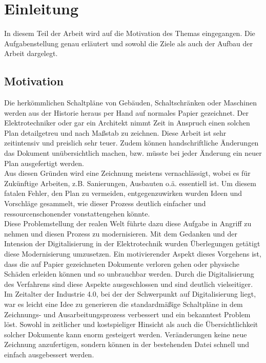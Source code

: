 
\chapter{Einleitung}
In diesem Teil der Arbeit wird auf die Motivation des Themas eingegangen. 
Die Aufgabenstellung genau erläutert und sowohl die Ziele als auch der Aufbau der Arbeit dargelegt.
\section{Motivation}
Die herkömmlichen Schaltpläne von Gebäuden, Schaltschränken oder Maschinen werden aus der Historie heraus per Hand auf normales Papier
gezeichnet. Der Elektrotechniker oder gar ein Architekt nimmt Zeit in Anspruch einen solchen Plan detailgetreu und 
nach Maßstab zu zeichnen. Diese Arbeit ist sehr zeitintensiv und preislich sehr teuer. Zudem können handschriftliche Änderungen
das Dokument unübersichtlich machen, bzw. müsste bei jeder Änderung ein neuer Plan ausgefertigt werden. 
\\Aus diesen Gründen wird eine Zeichnung meistens vernachlässigt, wobei es für Zukünftige Arbeiten,
z.B. Sanierungen, Ausbauten o.ä. essentiell ist. Um diesem fatalen Fehler, den Plan zu vermeiden, entgegenzuwirken wurden Ideen und
Vorschläge gesammelt, wie dieser Prozess deutlich einfacher und ressourcenschonender vonstattengehen könnte.
\\
\linebreak
Diese Problemstellung der realen Welt führte dazu diese Aufgabe in Angriff zu nehmen und diesen Prozess zu modernisieren.
Mit dem Gedanken und der Intension der Digitalisierung in der Elektrotechnik wurden Überlegungen getätigt diese Modernisierung
umzusetzen.
\linebreak
\linebreak
Ein motivierender Aspekt dieses Vorgehens ist, dass die auf Papier gezeichneten Dokumente verloren gehen oder physische Schäden erleiden können
und so unbrauchbar werden. Durch die Digitalisierung des Verfahrens sind diese Aspekte ausgeschlossen und sind deutlich vielseitiger.
\linebreak
\linebreak
Im Zeitalter der Industrie 4.0, bei der der Schwerpunkt auf Digitalisierung liegt, war es leicht eine Idee zu generieren die 
standardmäßige Schaltpläne in dem Zeichnungs- und Ausarbeitungsprozess verbessert und ein bekanntest Problem löst.
Sowohl in zeitlicher und kostspieliger Hinsicht als auch die Übersichtlichkeit
solcher Dokumente kann enorm gesteigert werden. Veränderungen keine neue Zeichnung anzufertigen, sondern können in der bestehenden
Datei schnell und einfach ausgebessert werden. 
\newpage
